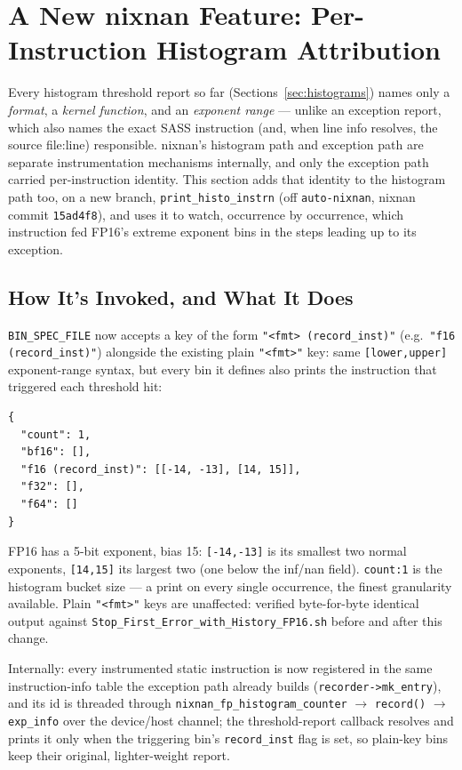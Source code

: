 \documentclass[11pt]{article}
\begin{document}
\section{A New nixnan Feature: Per-Instruction Histogram Attribution}
\label{sec:record-inst}

Every histogram threshold report so far (Sections~\ref{sec:histograms}) names only a
\emph{format}, a \emph{kernel function}, and an \emph{exponent range} --- unlike an
exception report, which also names the exact SASS instruction (and, when line info
resolves, the source file:line) responsible. nixnan's histogram path and exception path
are separate instrumentation mechanisms internally, and only the exception path carried
per-instruction identity. This section adds that identity to the histogram path too, on a
new branch, \texttt{print\_histo\_instrn} (off \texttt{auto-nixnan}, nixnan commit
\texttt{15ad4f8}), and uses it to watch, occurrence by occurrence, which instruction fed
FP16's extreme exponent bins in the steps leading up to its exception.

\subsection{How It's Invoked, and What It Does}

\texttt{BIN\_SPEC\_FILE} now accepts a key of the form \texttt{"<fmt> (record\_inst)"}
(e.g.\ \texttt{"f16 (record\_inst)"}) alongside the existing plain \texttt{"<fmt>"} key:
same \texttt{[lower,upper]} exponent-range syntax, but every bin it defines also prints
the instruction that triggered each threshold hit:
\begin{lstlisting}
{
  "count": 1,
  "bf16": [],
  "f16 (record_inst)": [[-14, -13], [14, 15]],
  "f32": [],
  "f64": []
}
\end{lstlisting}
FP16 has a 5-bit exponent, bias 15: \texttt{[-14,-13]} is its smallest two normal
exponents, \texttt{[14,15]} its largest two (one below the inf/nan field). \texttt{count:1}
is the histogram bucket size --- a print on every single occurrence, the finest
granularity available. Plain \texttt{"<fmt>"} keys are unaffected: verified byte-for-byte
identical output against \texttt{Stop\_First\_Error\_with\_History\_FP16.sh}
before and after this change.

Internally: every instrumented static instruction is now registered in the same
instruction-info table the exception path already builds (\texttt{recorder->mk\_entry}),
and its id is threaded through \texttt{nixnan\_fp\_histogram\_counter}
$\rightarrow$ \texttt{record()} $\rightarrow$ \texttt{exp\_info} over the device/host
channel; the threshold-report callback resolves and prints it only when the triggering
bin's \texttt{record\_inst} flag is set, so plain-key bins keep their original,
lighter-weight report.
\end{document}
